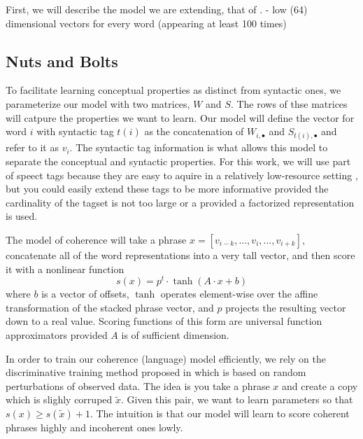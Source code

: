 \documentclass[11pt,letterpaper]{article}
\begin{document}
First, we will describe the model we are extending, that of \cite{rami}.
- low (64) dimensional vectors for every word (appearing at least 100 times)




\subsection{Nuts and Bolts}
To facilitate learning conceptual properties as distinct from syntactic ones,
we parameterize our model with two matrices, $W$ and $S$.
The rows of thse matrices will catpure the properties we want to learn.
Our model will define the vector for word $i$ with syntactic tag $t(i)$
as the concatenation of $W_{i,\bullet}$ and $S_{t(i),\bullet}$ and refer to it as $v_i$.
The syntactic tag information is what allows this model to separate the conceptual
and syntactic properties. For this work, we will use part of speect tags because
they are easy to aquire in a relatively low-resource setting \cite{pos},
but you could easily extend these tags to be more informative provided
the cardinality of the tagset is not too large or a provided a factorized representation is used.

The model of coherence will take a phrase $x = [v_{i-k}, ..., v_i, ..., v_{i+k}]$,
concatenate all of the word representations into a very tall vector, and then score it
with a nonlinear function
\[
	s(x) = p^t \cdot \tanh( A \cdot x + b )
\]
where $b$ is a vector of offsets,
$\tanh$ operates element-wise over the affine transformation of the stacked phrase vector,
and $p$ projects the resulting vector down to a real value.
Scoring functions of this form are universal function approximators
provided $A$ is of sufficient dimension\cite{Hornik:1989}.

In order to train our coherence (language) model efficiently, we rely on
the discriminative training method proposed in \cite{rami} which is based
on random perturbations of observed data. The idea is you take a phrase $x$
and create a copy which is slighly corruped $\tilde{x}$. Given this pair,
we want to learn parameters so that $s(x) \ge s(\tilde{x}) + 1$.
The intuition is that our model will learn to score coherent phrases highly
and incoherent ones lowly.
\end{document}
